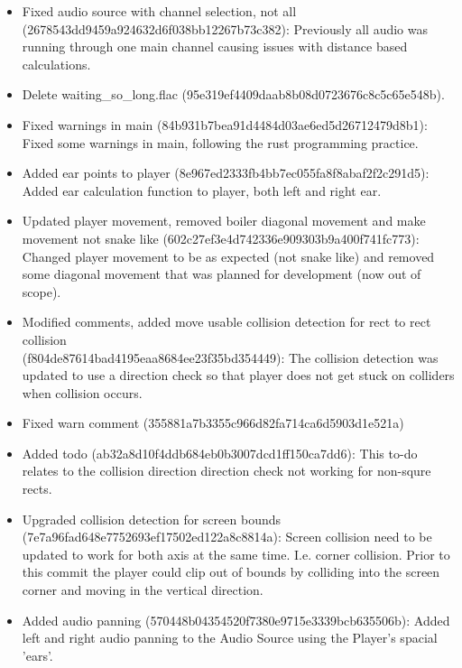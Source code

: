 \documentclass{article}
\begin{document}
\begin{itemize}
    \item Fixed audio source with channel selection, not all \\ (2678543dd9459a924632d6f038bb12267b73c382): Previously all audio was running through one main channel causing issues with distance based calculations.

    \item Delete waiting\_so\_long.flac (95e319ef4409daab8b08d0723676c8c5c65e548b).

    \item Fixed warnings in main (84b931b7bea91d4484d03ae6ed5d26712479d8b1): Fixed some warnings in main, following the rust programming practice.

    \item Added ear points to player (8e967ed2333fb4bb7ec055fa8f8abaf2f2c291d5): Added ear calculation function to player, both left and right ear.

    \item Updated player movement, removed boiler diagonal movement and make movement not snake like (602c27ef3e4d742336e909303b9a400f741fc773): Changed player movement to be as expected (not snake like) and removed some diagonal movement that was planned for development (now out of scope).

    \item Modified comments, added move usable collision detection for rect to rect collision \\ (f804de87614bad4195eaa8684ee23f35bd354449): The collision detection was updated to use a direction check so that player does not get stuck on colliders when collision occurs.

    \item Fixed warn comment (355881a7b3355c966d82fa714ca6d5903d1e521a)

    \item Added todo (ab32a8d10f4ddb684eb0b3007dcd1ff150ca7dd6): This to-do relates to the collision direction direction check not working for non-squre rects.

    \item Upgraded collision detection for screen bounds (7e7a96fad648e7752693ef17502ed122a8c8814a): Screen collision need to be updated to work for both axis at the same time. I.e. corner collision. Prior to this commit the player could clip out of bounds by colliding into the screen corner and moving in the vertical direction.

    \item Added audio panning (570448b04354520f7380e9715e3339bcb635506b): Added left and right audio panning to the Audio Source using the Player's spacial 'ears'.


\end{itemize}
\end{document}
